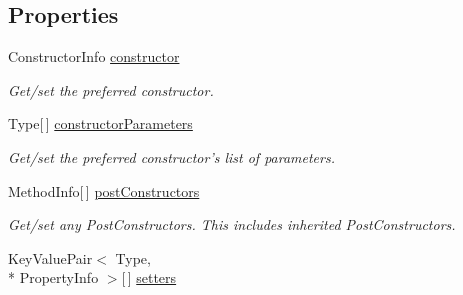 \subsection*{Properties}
\begin{DoxyCompactItemize}
\item 
\hypertarget{interfacestrange_1_1extensions_1_1reflector_1_1api_1_1_i_reflected_class_a0de808e619b042cf6c1670915210edf3}{Constructor\-Info \hyperlink{interfacestrange_1_1extensions_1_1reflector_1_1api_1_1_i_reflected_class_a0de808e619b042cf6c1670915210edf3}{constructor}}\label{interfacestrange_1_1extensions_1_1reflector_1_1api_1_1_i_reflected_class_a0de808e619b042cf6c1670915210edf3}

\begin{DoxyCompactList}\small\item\em Get/set the preferred constructor. \end{DoxyCompactList}\item 
\hypertarget{interfacestrange_1_1extensions_1_1reflector_1_1api_1_1_i_reflected_class_a4cad8b84924441a15008d3183a49f41c}{Type\mbox{[}$\,$\mbox{]} \hyperlink{interfacestrange_1_1extensions_1_1reflector_1_1api_1_1_i_reflected_class_a4cad8b84924441a15008d3183a49f41c}{constructor\-Parameters}}\label{interfacestrange_1_1extensions_1_1reflector_1_1api_1_1_i_reflected_class_a4cad8b84924441a15008d3183a49f41c}

\begin{DoxyCompactList}\small\item\em Get/set the preferred constructor's list of parameters. \end{DoxyCompactList}\item 
\hypertarget{interfacestrange_1_1extensions_1_1reflector_1_1api_1_1_i_reflected_class_a23705414bd05de366f28b60df085e0b3}{Method\-Info\mbox{[}$\,$\mbox{]} \hyperlink{interfacestrange_1_1extensions_1_1reflector_1_1api_1_1_i_reflected_class_a23705414bd05de366f28b60df085e0b3}{post\-Constructors}}\label{interfacestrange_1_1extensions_1_1reflector_1_1api_1_1_i_reflected_class_a23705414bd05de366f28b60df085e0b3}

\begin{DoxyCompactList}\small\item\em Get/set any Post\-Constructors. This includes inherited Post\-Constructors. \end{DoxyCompactList}\item 
\hypertarget{interfacestrange_1_1extensions_1_1reflector_1_1api_1_1_i_reflected_class_a27d795a13a05ebde2bf9efebd00e75cc}{Key\-Value\-Pair$<$ Type, \\*
Property\-Info $>$\mbox{[}$\,$\mbox{]} \hyperlink{interfacestrange_1_1extensions_1_1reflector_1_1api_1_1_i_reflected_class_a27d795a13a05ebde2bf9efebd00e75cc}{setters}}\label{interfacestrange_1_1extensions_1_1reflector_1_1api_1_1_i_reflected_class_a27d795a13a05ebde2bf9efebd00e75cc}


\end{DoxyCompactItemize}
